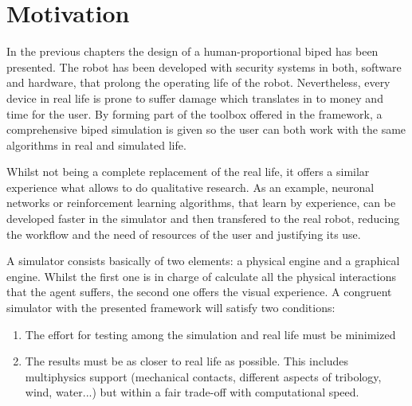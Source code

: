 \section{Motivation} %
\label{sec:sim_motivation}
In the previous chapters the design of a human-proportional biped has been presented. 
The robot has been developed with security systems in both, software and hardware, that prolong the operating life of the robot. 
Nevertheless, every device in real life is prone to suffer damage which translates in to money and time for the user.
By forming part of the toolbox offered in the framework, a comprehensive biped simulation is given so the user can both work with the same algorithms in real and simulated life.

Whilst not being a complete replacement of the real life, it offers a similar experience what allows to do qualitative research.
As an example, neuronal networks or reinforcement learning algorithms, that learn by experience, can be developed faster in the simulator and then transfered to the real robot, reducing the workflow and the need of resources of the user and justifying its use.

A simulator consists basically of two elements: a physical engine and a graphical engine.
Whilst the first one is in charge of calculate all the physical interactions that the agent suffers, the second one offers the visual experience.
A congruent simulator with the presented framework will satisfy two conditions:
\begin{enumerate}
  \item The effort for testing among the simulation and real life must be minimized
  \item The results must be as closer to real life as possible. This includes multiphysics support (mechanical contacts, different aspects of tribology, wind, water...) but within a fair trade-off with computational speed.
\end{enumerate}

